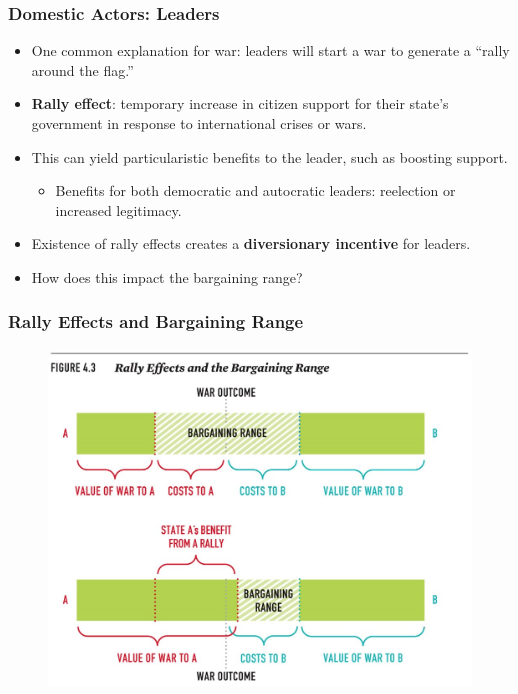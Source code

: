 \documentclass[handout]{beamer}
\begin{document}
\begin{frame} 
	\frametitle{\LARGE{Domestic Actors: Leaders}}
	\begin{itemize}
		\item One common explanation for war: leaders will start a war to generate a “rally around the flag.” \pause
		\item \textbf{Rally effect}: temporary increase in citizen support for their state's government in response to international crises or wars. \pause
		\item This can yield particularistic benefits to the leader, such as boosting support. \pause
		\begin{itemize}
			\item Benefits for both democratic and autocratic leaders: reelection or increased legitimacy.
		\end{itemize}
		\item Existence of rally effects creates a \textbf{diversionary incentive} for leaders. 
		\item How does this impact the bargaining range?
	\end{itemize}
\end{frame}

\begin{frame} 
	\frametitle{\LARGE{Rally Effects and Bargaining Range}}
	\begin{figure}[ht!]
		\centering
		\includegraphics[width=\textwidth,height=0.9\textheight,keepaspectratio]{Rallyeffectsbarg.jpg}
	\end{figure}
\end{frame}
\end{document}
